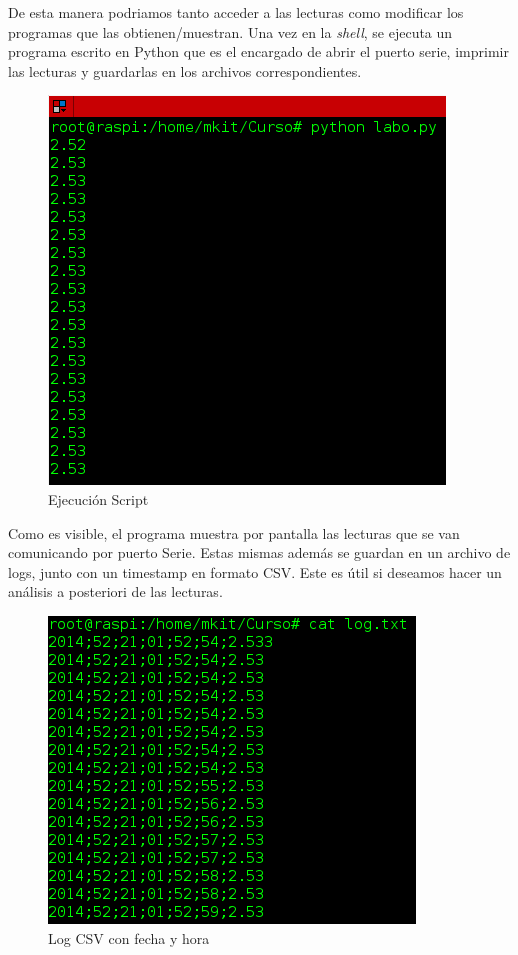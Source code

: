 \documentclass[12pt,a4paper]{article}
\begin{document}
			De esta manera podriamos tanto acceder a las lecturas como modificar los programas que las obtienen/muestran. Una vez en la \textit{shell}, se ejecuta un programa escrito en Python que es el encargado de abrir el puerto serie, imprimir las lecturas y guardarlas en los archivos correspondientes.

			\begin{figure}[H]
			\centering
				\includegraphics[scale=0.7]{images/Screenshot2.png}\caption{Ejecución Script}
			\end{figure}

			Como es visible, el programa muestra por pantalla las lecturas que se van comunicando por puerto Serie. Estas mismas además se guardan en un archivo de logs, junto con un timestamp en formato CSV. Este es útil si deseamos hacer un análisis a posteriori de las lecturas.

			\begin{figure}[H]
			\centering
				\includegraphics[scale=0.7]{images/Screenshot3.png}\caption{Log CSV con fecha y hora}
			\end{figure}
\end{document}
